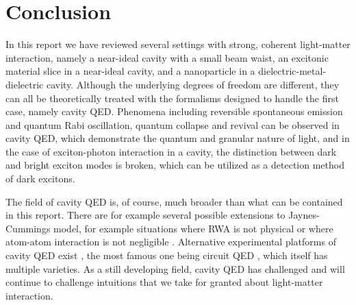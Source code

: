 \documentclass[hyperref, a4paper]{article}
\begin{document}
\section{Conclusion}\label{sec:conclusion}

In this report we have reviewed several settings with strong, coherent light-matter interaction,
namely a near-ideal cavity with a small beam waist,
an excitonic material slice in a near-ideal cavity,
and a nanoparticle in a dielectric-metal-dielectric cavity.
Although the underlying degrees of freedom are different,
they can all be theoretically treated with the formalisms designed to handle the first case, 
namely cavity QED.
Phenomena including reversible spontaneous emission and quantum Rabi oscillation,
quantum collapse and revival can be observed in cavity QED,
which demonstrate the quantum and granular nature of light,
and in the case of exciton-photon interaction in a cavity,
the distinction between dark and bright exciton modes is broken,
which can be utilized as a detection method of dark excitons.

The field of cavity QED is, of course, much broader than what can be contained in this report.
There are for example several possible extensions to Jaynes-Cummings model,
for example situations where RWA is not physical \cite{larson2012absence}
or where atom-atom interaction is not negligible \cite{vaidya2018tunable}.
Alternative experimental platforms of cavity QED exist 
\cite{le2006cavity,hummer2013weak,blais2021circuit},
the most famous one being circuit QED \cite{blais2021circuit},
which itself has multiple varieties.
As a still developing field,
cavity QED has challenged and will continue to challenge
intuitions that we take for granted about light-matter interaction.

\printbibliography
\end{document}
